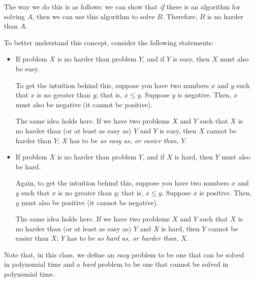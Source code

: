 \documentclass[letterpaper]{article}
\begin{document}
\bigskip 

The way we do this is as follows: we can show that \emph{if} there is an algorithm for solving $A$, then we can use this algorithm to solve $B$. Therefore, $B$ is no harder than $A$. 

\bigskip 

To better understand this concept, consider the following statements:
\begin{itemize}
    \item If problem $X$ is no harder than problem $Y$, and if $Y$ is easy, then $X$ must also be easy. 
    \begin{mdframed}[]
        To get the intuition behind this, suppose you have two numbers $x$ and $y$ such that $x$ is no greater than $y$; that is, $x \leq y$. Suppose $y$ is negative. Then, $x$ must also be negative (it cannot be positive). 

        \bigskip 

        The same idea holds here. If we have two problems $X$ and $Y$ such that $X$ is no harder than (or at least as easy as) $Y$ and $Y$ is easy, then $X$ cannot be harder than $Y$; $X$ has to be \emph{as easy as, or easier than,} $Y$. 
    \end{mdframed}
    \item If problem $X$ is no harder than problem $Y$, and if $X$ is hard, then $Y$ must also be hard. 
    \begin{mdframed}[]
        Again, to get the intuition behind this, suppose you have two numbers $x$ and $y$ such that $x$ is no greater than $y$; that is, $x \leq y$. Suppose $x$ is positive. Then, $y$ must also be positive (it cannot be negative). 

        \bigskip 

        The same idea holds here. If we have two problems $X$ and $Y$ such that $X$ is no harder than (or at least as easy as) $Y$ and $X$ is hard, then $Y$ cannot be easier than $X$; $Y$ has to be \emph{as hard as, or harder than,} $X$. 
    \end{mdframed}
\end{itemize}
Note that, in this class, we define an \emph{easy} problem to be one that can be solved in polynomial time and a \emph{hard} problem to be one that cannot be solved in polynomial time. 
\end{document}
